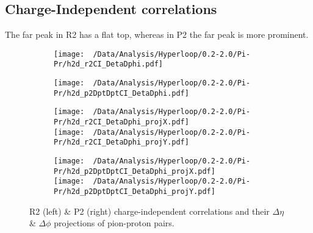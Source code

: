 \documentclass[12pt,a4paper,twoside]{report}
\begin{document}
\subsection{Charge-Independent correlations}
The far peak in R2 has a flat top, whereas in P2 the far peak is more prominent.
\begin{figure}[H]
	\begin{subfigure}{0.49\linewidth}
		\texttt{[image: ~/Data/Analysis/Hyperloop/0.2-2.0/Pi-Pr/h2d\_r2CI\_DetaDphi.pdf]}\\
	\end{subfigure}
	\begin{subfigure}{0.49\linewidth}
		\texttt{[image: ~/Data/Analysis/Hyperloop/0.2-2.0/Pi-Pr/h2d\_p2DptDptCI\_DetaDphi.pdf]}\\
	\end{subfigure}
\end{figure}
\begin{figure}[H]
	\ContinuedFloat
	\begin{subfigure}{0.49\linewidth}
		\texttt{[image: ~/Data/Analysis/Hyperloop/0.2-2.0/Pi-Pr/h2d\_r2CI\_DetaDphi\_projX.pdf]}\\
		\texttt{[image: ~/Data/Analysis/Hyperloop/0.2-2.0/Pi-Pr/h2d\_r2CI\_DetaDphi\_projY.pdf]}\\
	\end{subfigure}
	\begin{subfigure}{0.49\linewidth}
		\texttt{[image: ~/Data/Analysis/Hyperloop/0.2-2.0/Pi-Pr/h2d\_p2DptDptCI\_DetaDphi\_projX.pdf]}\\
		\texttt{[image: ~/Data/Analysis/Hyperloop/0.2-2.0/Pi-Pr/h2d\_p2DptDptCI\_DetaDphi\_projY.pdf]}\\
	\end{subfigure}
	\caption{R2 (left) \& P2 (right) charge-independent correlations and their $\Delta\eta$ \& $\Delta\phi$ projections of pion-proton pairs.}
\end{figure}
\end{document}
